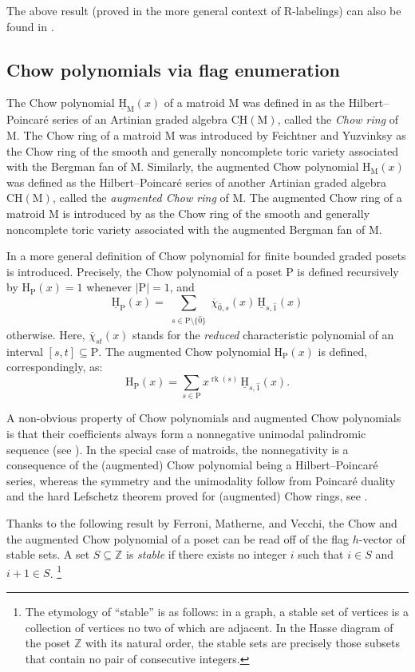\documentclass[11pt,a4paper]{amsart}
\theoremstyle{results}
\theoremstyle{definitions}
\def\Z{\mathbb{Z}}
\def\P{\mathbb{P}}
\def\Z{\mathbb{Z}}
\newcommand{\CH}{\mathrm{CH}}
\newcommand{\uH}{\underline{\mathrm{H}}}
\newcommand{\uCH}{\underline{\textrm{CH}}}
\newcommand{\rk}{\operatorname{rk}}
\newcommand{\M}{\mathrm{M}}
\newcommand{\zero}{\hat{0}}
\renewcommand{\P}{\mathrm{P}}
\renewcommand{\H}{\mathrm{H}}
\renewcommand{\hat}{\widehat}
\begin{document}
The above result (proved in the more general context of R-labelings) can also be found in \cite[Theorem~3.14.2]{stanley-ec1}.


\subsection{Chow polynomials via flag enumeration}\label{sec:chow-poly-recap}

The Chow polynomial $\uH_{\M}(x)$ of a matroid $\M$ was defined in \cite{ferroni-matherne-stevens-vecchi} as the Hilbert--Poincar\'e series of an Artinian graded algebra $\uCH(\M)$, called the \emph{Chow ring} of $\M$. The Chow ring of a matroid $\M$ was introduced by Feichtner and Yuzvinksy \cite{feichtner2004chow} as the Chow ring of the smooth and generally noncomplete toric variety associated with the Bergman fan of $\M$. Similarly, the augmented Chow polynomial $\H_\M(x)$ was defined as the Hilbert--Poincar\'e series of another Artinian graded algebra $\CH(\M)$, called the \emph{augmented Chow ring} of $\M$. The augmented Chow ring of a matroid $\M$ is introduced by \cite{braden2020singular} as the Chow ring of the smooth and generally noncomplete toric variety associated with the augmented Bergman fan of $\M$. 

In \cite{ferroni-matherne-vecchi} a more general definition of Chow polynomial for finite bounded graded posets is introduced. Precisely, the Chow polynomial of a poset $\P$ is defined recursively by $\H_{\P}(x) = 1$ whenever $|\P| = 1$, and
    \[ \uH_{\P}(x) = \sum_{\substack{s\in \P\setminus\{\zero\}}} \overline{\chi}_{\widehat{0},s}(x)\, \uH_{s,\widehat{1}}(x)\]
otherwise. Here, $\overline{\chi}_{st}(x)$ stands for the \emph{reduced} characteristic polynomial of an interval $[s,t]\subseteq \P$. The augmented Chow polynomial $\H_{\P}(x)$ is defined, correspondingly, as:
    \[ \H_{\P}(x) = \sum_{s\in \P} x^{\rk(s)}\, \uH_{s,\widehat{1}}(x).\]

A non-obvious property of Chow polynomials and augmented Chow polynomials is that their coefficients always form a nonnegative unimodal palindromic sequence (see \cite[Theorem~1.3]{ferroni-matherne-vecchi}). In the special case of matroids, the nonnegativity is a consequence of the (augmented) Chow polynomial being a Hilbert--Poincar\'e series, whereas the symmetry and the unimodality follow from Poincar\'e duality and the hard Lefschetz theorem proved for (augmented) Chow rings, see \cite{adiprasito2018hodge,BRADEN2022108646}. 

Thanks to the following result by Ferroni, Matherne, and Vecchi, the Chow and the augmented Chow polynomial of a poset can be read off of the flag $h$-vector of stable sets. A set $S \subseteq \Z$ is \emph{stable} if there exists no integer $i$ such that $i \in S$ and $i + 1 \in S$. \footnote{The etymology of ``stable'' is as follows: in a graph, a stable set of vertices is a collection of vertices no two of which are adjacent. In the Hasse diagram of the poset $\mathbb{Z}$ with its natural order, the stable sets are precisely those subsets that contain no pair of consecutive integers.}
\end{document}
